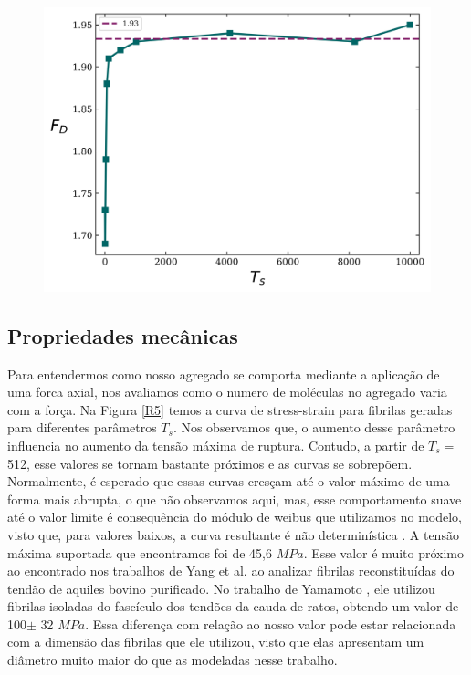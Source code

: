 \documentclass{article}
\begin{document}
\begin{figure}[H]
    \centering
    \includegraphics[width=\textwidth]{figures/fd_ts.png}

    \caption{ } 

    \label{R4}
\end{figure}


\subsection{Propriedades mecânicas}

Para entendermos como nosso agregado se comporta mediante a aplicação de uma forca axial, nos avaliamos como o numero de moléculas no agregado varia com a força. Na Figura \ref{R5} temos a curva de stress-strain para fibrilas geradas para diferentes parâmetros $T_{s}$. Nos observamos que, o aumento desse parâmetro influencia no aumento da tensão máxima de ruptura. Contudo, a partir de $T_{s} = $ 512, esse valores se tornam bastante próximos e as curvas se sobrepõem. Normalmente, é esperado que essas curvas cresçam até o valor máximo de uma forma mais abrupta, o que não observamos aqui, mas, esse comportamento suave até o valor limite é consequência do módulo de weibus que utilizamos no modelo, visto que, para valores baixos, a curva resultante é não determinística \cite{Parkinson1997}. 
A tensão máxima suportada que encontramos foi de 45,6 $MPa$. Esse valor é muito próximo ao encontrado nos trabalhos de Yang et al. \cite{YANG2012148} ao analizar fibrilas reconstituídas do tendão de aquiles bovino purificado. No trabalho de Yamamoto \cite{Noritaka}, ele utilizou fibrilas isoladas do fascículo dos tendões da cauda de ratos, obtendo um valor de 100$\pm$ 32 $MPa$. Essa diferença com relação ao nosso valor pode estar relacionada com a dimensão das fibrilas que ele utilizou, visto que elas apresentam um diâmetro muito maior do que as modeladas nesse trabalho.
\end{document}
